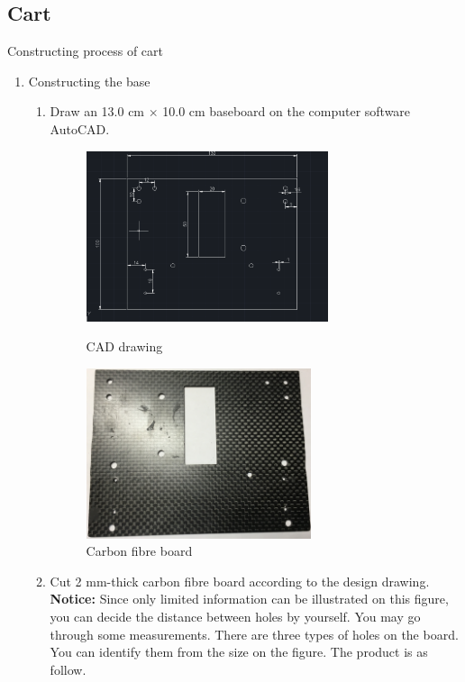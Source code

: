 %
%

\newpage

\subsection{Cart}
Constructing process of cart
\begin{enumerate}
\item Constructing the base
	\begin{enumerate}
	\item	Draw an 13.0 cm $\times$ 10.0 cm baseboard on the computer software AutoCAD.
	\begin{figure}[H]
	\begin{minipage}{0.48\textwidth}
	\centering
	\includegraphics[height=5cm]{figure/procedure/p1}
 	\caption{CAD drawing \label{fig:cad}}
	\end{minipage}
	\begin{minipage}{0.48\textwidth}
	\centering
	\includegraphics[height=5cm]{figure/procedure/p2}
 	\caption{Carbon fibre board \label{fig:carbonFiberBoard}}
	\end{minipage}
	\end{figure}
	\item Cut 2 mm-thick carbon fibre board according to the design drawing. \\
	\textbf{Notice:} Since only limited information can be illustrated on this figure, you can decide the distance between holes by yourself. You may go through some measurements. There are three types of holes on the board. You can identify them from the size on the figure. The product is as follow. 

\end{enumerate}
\end{enumerate}
